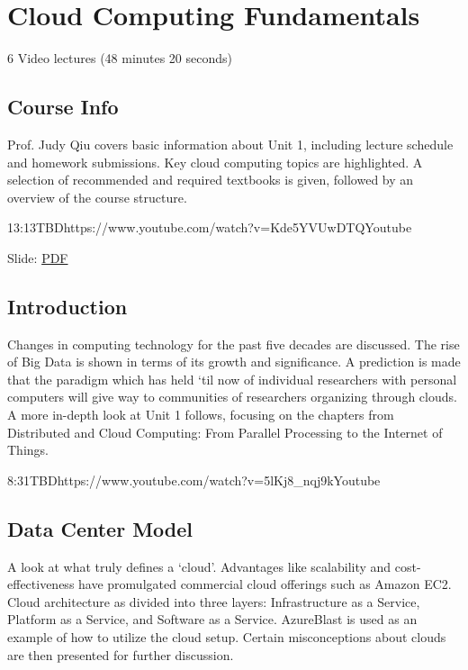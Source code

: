 \FILENAME

\chapter{Cloud Computing Fundamentals}

  6 Video lectures (48 minutes 20 seconds)

\section{Course Info}

Prof. Judy Qiu covers basic information about Unit 1, including lecture
schedule and homework submissions. Key cloud computing topics are
highlighted. A selection of recommended and required textbooks is given,
followed by an overview of the course structure.

  {13:13}{TBD}{https://www.youtube.com/watch?v=Kde5YVUwDTQ}{Youtube}


  Slide:
  \href{https://drive.google.com/open?id=0B88HKpainTSfYjU4QzdDSms0Nk0}{PDF}

\section{Introduction}

Changes in computing technology for the past five decades are discussed.
The rise of Big Data is shown in terms of its growth and significance. A
prediction is made that the paradigm which has held `til now of
individual researchers with personal computers will give way to
communities of researchers organizing through clouds. A more in-depth
look at Unit 1 follows, focusing on the chapters from Distributed and
Cloud Computing: From Parallel Processing to the Internet of Things.

  {8:31}{TBD}{https://www.youtube.com/watch?v=5lKj8_nqj9k}{Youtube}


\section{Data Center Model}

A look at what truly defines a `cloud'. Advantages like scalability and
cost-effectiveness have promulgated commercial cloud offerings such as
Amazon EC2. Cloud architecture as divided into three layers:
Infrastructure as a Service, Platform as a Service, and Software as a
Service. AzureBlast is used as an example of how to utilize the cloud
setup. Certain misconceptions about clouds are then presented for
further discussion.

